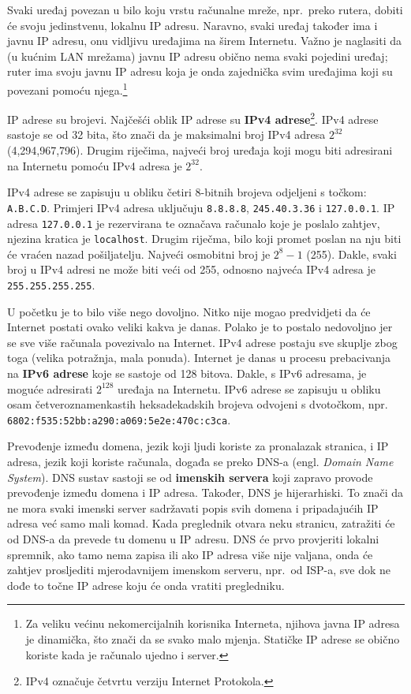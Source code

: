 Svaki uređaj povezan u bilo koju vrstu računalne mreže, npr.\ preko rutera, dobiti će svoju jedinstvenu, lokalnu IP adresu.
Naravno, svaki uređaj također ima i javnu IP adresu, onu vidljivu uređajima na širem Internetu.
Važno je naglasiti da (u kućnim LAN mrežama) javnu IP adresu obično nema svaki pojedini uređaj; ruter ima svoju javnu IP adresu koja je onda zajednička svim uređajima koji su povezani pomoću njega.\footnote{Za veliku većinu nekomercijalnih korisnika Interneta, njihova javna IP adresa je dinamička, što znači da se svako malo mjenja. Statičke IP adrese se obično koriste kada je računalo ujedno i server.}

IP adrese su brojevi.
Najčešći oblik IP adrese su \textbf{IPv4 adrese}\footnote{IPv4 označuje četvrtu verziju Internet Protokola.}.
IPv4 adrese sastoje se od 32 bita, što znači da je maksimalni broj IPv4 adresa $ 2^{32} $ (4,294,967,796).
Drugim riječima, najveći broj uređaja koji mogu biti adresirani na Internetu pomoću IPv4 adresa je $ 2^{32} $.

IPv4 adrese se zapisuju u obliku četiri 8-bitnih brojeva odjeljeni s točkom: \verb|A.B.C.D|.
Primjeri IPv4 adresa uključuju \verb|8.8.8.8|, \verb|245.40.3.36| i \verb|127.0.0.1|.
IP adresa \verb|127.0.0.1| je rezervirana te označava računalo koje je poslalo zahtjev, njezina kratica je \verb|localhost|.
Drugim riječma, bilo koji promet poslan na nju biti će vraćen nazad pošiljatelju.
Najveći osmobitni broj je $ 2^8 - 1 $ (255).
Dakle, svaki broj u IPv4 adresi ne može biti veći od 255, odnosno najveća IPv4 adresa je \verb|255.255.255.255|.

U početku je to bilo više nego dovoljno.
Nitko nije mogao predvidjeti da će Internet postati ovako veliki kakva je danas.
Polako je to postalo nedovoljno jer se sve više računala povezivalo na Internet.
IPv4 adrese postaju sve skuplje zbog toga (velika potražnja, mala ponuda).
Internet je danas u procesu prebacivanja na \textbf{IPv6 adrese} koje se sastoje od 128 bitova.
Dakle, s IPv6 adresama, je moguće adresirati $ 2^{128} $ uređaja na Internetu.
IPv6 adrese se zapisuju u obliku osam četveroznamenkastih heksadekadskih brojeva odvojeni s dvotočkom, npr. \verb|6802:f535:52bb:a290:a069:5e2e:470c:c3ca|.

Prevođenje između domena, jezik koji ljudi koriste za pronalazak stranica, i IP adresa, jezik koji koriste računala, događa se preko DNS-a (engl. \textit{Domain Name System}).
DNS sustav sastoji se od \textbf{imenskih servera} koji zapravo provode prevođenje između domena i IP adresa.
Također, DNS je hijerarhiski.
To znači da ne mora svaki imenski server sadržavati popis svih domena i pripadajućih IP adresa već samo mali komad.
Kada preglednik otvara neku stranicu, zatražiti će od DNS-a da prevede tu domenu u IP adresu.
DNS će prvo provjeriti lokalni spremnik, ako tamo nema zapisa ili ako IP adresa više nije valjana, onda će zahtjev prosljediti mjerodavnijem imenskom serveru, npr.\ od ISP-a, sve dok ne dođe to točne IP adrese koju će onda vratiti pregledniku.

